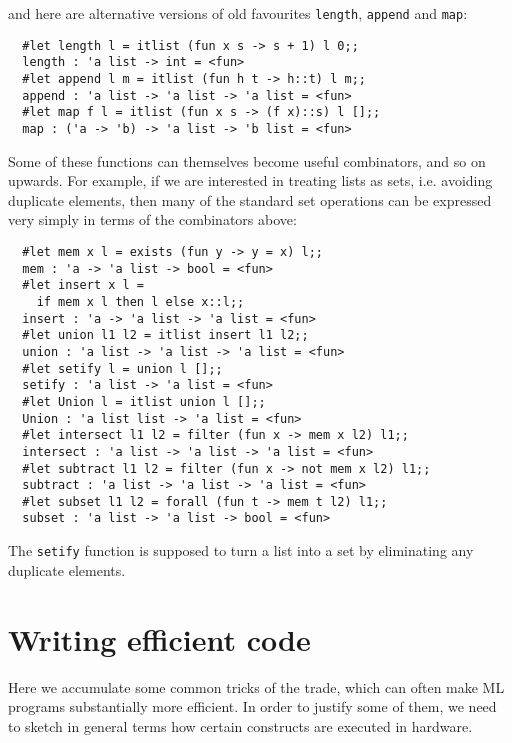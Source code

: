 \noindent and here are alternative versions of old favourites {\tt length},
{\tt append} and {\tt map}:

\begin{boxed}\begin{verbatim}
  #let length l = itlist (fun x s -> s + 1) l 0;;
  length : 'a list -> int = <fun>
  #let append l m = itlist (fun h t -> h::t) l m;;
  append : 'a list -> 'a list -> 'a list = <fun>
  #let map f l = itlist (fun x s -> (f x)::s) l [];;
  map : ('a -> 'b) -> 'a list -> 'b list = <fun>
\end{verbatim}\end{boxed}

Some of these functions can themselves become useful combinators, and so on
upwards. For example, if we are interested in treating lists as sets, i.e.
avoiding duplicate elements, then many of the standard set operations can be
expressed very simply in terms of the combinators above:

\begin{boxed}\begin{verbatim}
  #let mem x l = exists (fun y -> y = x) l;;
  mem : 'a -> 'a list -> bool = <fun>
  #let insert x l =
    if mem x l then l else x::l;;
  insert : 'a -> 'a list -> 'a list = <fun>
  #let union l1 l2 = itlist insert l1 l2;;
  union : 'a list -> 'a list -> 'a list = <fun>
  #let setify l = union l [];;
  setify : 'a list -> 'a list = <fun>
  #let Union l = itlist union l [];;
  Union : 'a list list -> 'a list = <fun>
  #let intersect l1 l2 = filter (fun x -> mem x l2) l1;;
  intersect : 'a list -> 'a list -> 'a list = <fun>
  #let subtract l1 l2 = filter (fun x -> not mem x l2) l1;;
  subtract : 'a list -> 'a list -> 'a list = <fun>
  #let subset l1 l2 = forall (fun t -> mem t l2) l1;;
  subset : 'a list -> 'a list -> bool = <fun>
\end{verbatim}\end{boxed}

\noindent The {\tt setify} function is supposed to turn a list into a set by
eliminating any duplicate elements.

\section{Writing efficient code}

Here we accumulate some common tricks of the trade, which can often make ML
programs substantially more efficient. In order to justify some of them, we
need to sketch in general terms how certain constructs are executed in
hardware.

